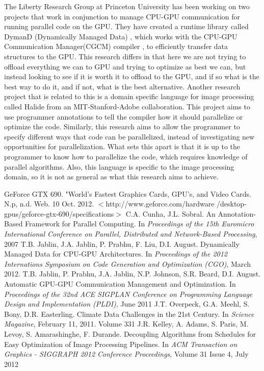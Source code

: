 \documentclass[a4paper,12pt]{article}
\begin{document}
The Liberty Research Group at Princeton University has been working on two projects that work in conjunction to manage CPU-GPU communication for running parallel code on the GPU.  They have created a runtime library called DymanD (Dynamically Managed Data) \cite{dymand}, which works with the CPU-GPU Communication Manager(CGCM) compiler \cite{cgcm}, to efficiently transfer data structures to the GPU.  This research differs in that here we are not trying to offload everything we can to GPU and trying to optimize as best we can, but instead looking to see if it is worth it to offload to the GPU, and if so what is the best way to do it, and if not, what is the best alternative.  Another research project that is related to this is a domain specific language for image processing called Halide from an MIT-Stanford-Adobe collaboration\cite{halide}.  This project aims to use programmer annotations to tell the compiler how it should parallelize or optimize the code.  Similarly, this research aims to allow the programmer to specify different ways that code can be parallelized, instead of investigating new opportunities for parallelization.  What sets this apart is that it is up to the programmer to know how to parallelize the code, which requires knowledge of parallel algorithms.  Also, this language is specific to the image processing domain, so it is not as general as what this research aims to achieve.
\newpage
\begin{thebibliography}{9}
 GeForce GTX 690. "World's Fastest Graphics Cards, GPU's, and Video Cards. N.p, n.d. Web. 10 Oct. 2012.
 $<$http://www.geforce.com/hardware /desktop-gpus/geforce-gtx-690/specifications$>$
 C.A. Cunha, J.L. Sobral. An Annotation-Based Framework for Parallel Computing. In \textit{Proceedings of the 15th Euromicro International Conference on Parallel, Distributed and Network-Based Processing}, 2007
 T.B. Jablin, J.A. Jablin, P. Prabhu, F. Liu, D.I. August. Dynamically Managed Data for CPU-GPU Architectures. In \textit{Proceedings of the 2012 Internations Symposium on Code Generation and Optimization (CGO)}, March 2012.
T.B. Jablin, P. Prabhu, J.A. Jablin, N.P. Johnson, S.R. Beard, D.I. August. Automatic GPU-GPU Communication Management and Optimization. In \textit{Proceedings of the 32nd ACE SIGPLAN Conference on Programming Language Design and Implementation (PLDI)}, June 2011
 J.T. Overpeck, G.A. Meehl, S. Bony, D.R. Easterling.  Climate Data Challenges in the 21st Century.  In \textit{Science Magazine}, February 11, 2011.  Volume 331
 J.R. Kelley, A. Adams, S. Paris, M. Levoy, S. Amarashinghe, F. Durande.  Decoupling Algorithms from Schedules for Easy Optimization of Image Processing Pipelines.  In \textit{ACM Transaction on Graphics - SIGGRAPH 2012 Conference Proceedings}, Volume 31 Issue 4, July 2012
\end{thebibliography}
\end{document}
